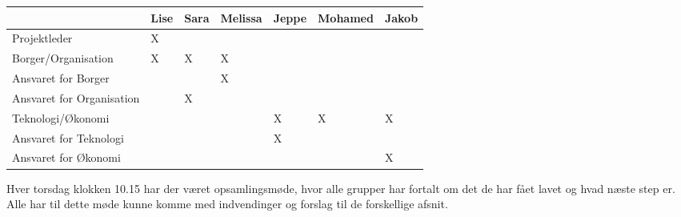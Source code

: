 \begin{table}[h]
\begin{tabular}{lllllll}
& Lise & Sara & Melissa &Jeppe &Mohamed & Jakob\\
\midrule
Projektleder &  X & & & & &\\
\midrule
Borger/Organisation &X & X & X & & &\\
Ansvaret for Borger & &  & X& & &\\
Ansvaret for Organisation & & X&  & & &\\
\midrule
Teknologi/Økonomi & & & & X &  X & X\\
Ansvaret for Teknologi & & & & X & &\\
Ansvaret for Økonomi & & & & & &X\\

\end{tabular}
\end{table} 

Hver torsdag klokken 10.15 har der været opsamlingsmøde, hvor alle grupper har fortalt om det de har fået lavet og hvad næste step er. Alle har til dette møde kunne komme med indvendinger og forslag til de forskellige afsnit.   
	

